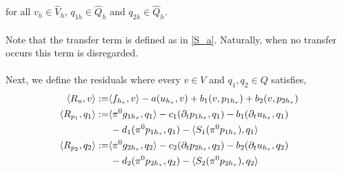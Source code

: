 for all $v_h \in \hat{V}_h$, $q_{1h} \in \hat{Q}_h $ and $q_{2h} \in \hat{Q}_h$.
\\
\\
Note that the transfer term is defined as in \eqref{S_a}. Naturally, when no transfer occurs this term is disregarded. 
\\
\\
Next, we define the residuals where every $v \in V$ and $q_1, q_2 \in Q$ satisfies,
\begin{align}
\langle R_u, v\rangle := & \langle f_{h_\tau}, v\rangle - a(u_{h_\tau}, v) + b_1(v, p_{1h_\tau}) + b_2(v, p_{2h_\tau}) \\
\langle R_{p_1}, q_1\rangle := & \langle \pi^0g_{1h_\tau}, q_1 \rangle - c_1(\partial_t p_{1h_\tau}, q_1) - b_1(\partial_t u_{h_\tau}, q_1)  \\
& \, - d_1(\pi^0p_{1h_\tau}, q_1) - \langle S_1(\pi^0p_{1h_\tau}), q_1 \rangle \notag\\
\langle R_{p_2}, q_2\rangle := & \langle \pi^0g_{2h_\tau}, q_2 \rangle - c_2(\partial_t p_{2h_\tau}, q_2) - b_2(\partial_t u_{h_\tau}, q_2) \\
& \, - d_2(\pi^0p_{2h_\tau}, q_2) - \langle S_2(\pi^0p_{2h_\tau}), q_2\rangle \notag
\end{align}
